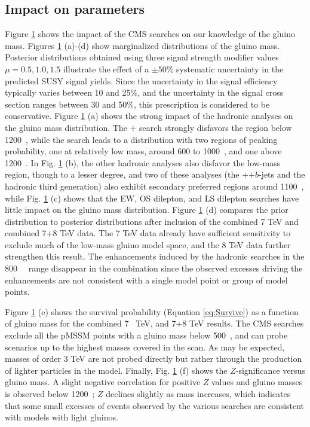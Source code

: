 \subsection{Impact on parameters}
Figure \ref{fig:mg} shows the impact of the CMS searches on our
knowledge of the gluino mass. Figures \ref{fig:mg} (a)-(d) show marginalized
distributions of the gluino mass.  Posterior distributions obtained
using three  signal strength modifier values $\mu = 0.5, 1.0, 1.5$
illustrate the effect of a $\pm50$\% systematic uncertainty in the
predicted SUSY signal yields.  Since the uncertainty in the signal efficiency typically varies between 10 and 25\%, and the uncertainty in the signal cross section ranges between 30 and 50\%, this prescription is considered to be conservative. Figure \ref{fig:mg} (a) shows the strong impact of
the hadronic analyses on the gluino mass distribution.  The
\HT{}$+$\MHT{} search strongly disfavors the region below 1200~\GeV,
while the \MTtwo{} search leads to a distribution with two regions of peaking probability, one at relatively low mass, around 600 to 1000~\GeV, and one
above 1200~\GeV.  In Fig. \ref{fig:mg} (b), the other hadronic
analyses also disfavor the low-mass region, though to a lesser degree,
 and two of these analyses (the \HT{}$+$\MET{}$+b$-jets and the
 hadronic third generation) also exhibit secondary
 preferred regions around 1100~\GeV, while Fig. \ref{fig:mg} (c) shows that the EW, OS dilepton, and LS dilepton searches have little impact on the gluino mass distribution.
Figure \ref{fig:mg} (d) compares the  prior distribution to posterior distributions after inclusion of the combined 7 TeV and combined 7$+$8 TeV data.  The 7 TeV data already have sufficient sensitivity to exclude much of the low-mass gluino model space, and the 8 TeV data further strengthen this result. The enhancements induced by the hadronic
searches in the 800~\GeV~ range disappear in the combination
since the observed excesses driving the enhancements are not
consistent with a single model point or group of model points.


\begin{figure}[t]
\vspace{1mm}
    \caption{}
    \label{fig:mg}
\end{figure}

Figure \ref{fig:mg} (e) shows the survival probability (Equation \ref{eq:Survive}) as a function of gluino mass
for the combined 7~ TeV, and 7$+$8 TeV results. 
The CMS searches exclude all the pMSSM points with a gluino mass below 500~\GeV, and can probe scenarios up to the highest masses covered in the scan.  As may be expected, masses of order 3 TeV are not probed directly but rather through the production of lighter particles in the model.   
Finally, Fig. \ref{fig:mg} (f) shows the $Z$-significance versus gluino mass.  A
slight negative correlation for positive $Z$ values and gluino masses
is observed below 1200~\GeV; $Z$ declines slightly as mass
increases, which indicates that some small excesses of events observed by the various searches are consistent with models with light gluinos.  

